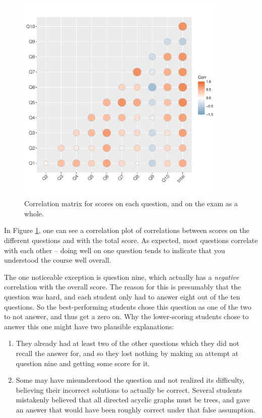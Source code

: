 \documentclass[nobib]{tufte-handout}
\begin{document}
\begin{figure}
  \centering
  \includegraphics[width = 0.9\textwidth]{correlation_matrix.pdf}
  \caption[Score correlation matrix]{Correlation matrix for scores on each question, and on the exam as a whole.}
  \label{fig:corrplot}
\end{figure}

In Figure \ref{fig:corrplot}, one can see a correlation plot of correlations between scores on the different questions and with the total score. As expected, most questions correlate with each other -- doing well on one question tends to indicate that you understood the course well overall.

The one noticeable exception is question nine, which actually has a \emph{negative} correlation with the overall score. The reason for this is presumably that the question was hard, and each student only had to answer eight out of the ten questions. So the best-performing students chose this question as one of the two to not answer, and thus get a zero on. Why the lower-scoring students chose to answer this one might have two plausible explanations:
\begin{enumerate}
  \item They already had at least two of the other questions which they did not recall the answer for, and so they lost nothing by making an attempt at question nine and getting some score for it.
  \item Some may have misunderstood the question and not realized its difficulty, believing their incorrect solutions to actually be correct. Several students mistakenly believed that all directed acyclic graphs must be trees, and gave an answer that would have been roughly correct under that false assumption.
\end{enumerate}
\end{document}
